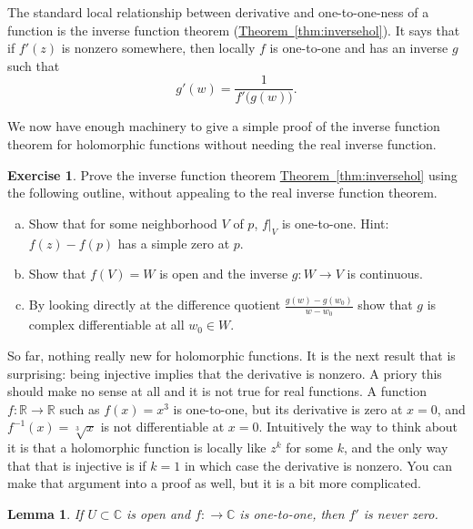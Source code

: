 \documentclass[12pt,openany]{book}
\newcommand{\C}{{\mathbb{C}}}
\newcommand{\R}{{\mathbb{R}}}
\theoremstyle{plain}
\newtheorem{lemma}[thm]{Lemma}
\theoremstyle{remark}
\theoremstyle{definition}
\newenvironment{exbox}{%
    \def\FrameCommand{\vrule width 1pt \relax\hspace {10pt}}%
    \MakeFramed {\advance \hsize -\width \FrameRestore }%
}{%
    \endMakeFramed
}
\newenvironment{exparts}{%
    \leavevmode\begin{enumerate}[a),noitemsep,topsep=0pt,parsep=0pt,partopsep=0pt]
}{%
    \end{enumerate}
}
\theoremstyle{exercise}
\newtheorem{exercise}{Exercise}[section]
\theoremstyle{example}
\newcommand{\thmref}[1]{\hyperref[#1]{Theorem~\ref*{#1}}}
\begin{document}
The standard local relationship between derivative and one-to-one-ness of a
function is the inverse function theorem (\thmref{thm:inversehol}).
It says that if $f'(z)$ is nonzero somewhere, then locally $f$ is
one-to-one and has an inverse $g$ such that
\begin{equation*}
g'(w) = \frac{1}{f'\bigl(g(w)\bigr)} .
\end{equation*}

We now have enough machinery to give a simple proof
of the inverse function theorem for holomorphic functions
without needing the real inverse function.

\begin{exbox}
\begin{exercise}
Prove the inverse function theorem \thmref{thm:inversehol}
using the following outline, without appealing to the real inverse function
theorem.
\begin{exparts}
\item Show that for some neighborhood $V$ of $p$, $f|_V$ is one-to-one.
Hint: $f(z)-f(p)$ has a simple zero at $p$.
\item Show that $f(V) = W$ is open and the inverse $g \colon W \to V$ is
continuous.
\item By looking directly at the difference quotient $\frac{g(w)-g(w_0)}{w-w_0}$
show that $g$ is complex differentiable at all $w_0 \in W$.
\end{exparts}
\end{exercise}
\end{exbox}

So far, nothing really new for holomorphic functions.
It is the next
result that is surprising: being injective
implies that the derivative is nonzero.
A priory this should make no sense at all and it is not true for real functions.
A function $f \colon \R \to \R$ such as $f(x) = x^3$
is one-to-one, but its derivative is zero at $x=0$, and $f^{-1}(x) =
\sqrt[3]{x}$ is not differentiable at $x=0$.
Intuitively the way to think about it is that a holomorphic function is
locally like $z^k$ for some $k$, and the only way that that is injective is
if $k=1$ in which case the derivative is nonzero.  You can make that
argument into a proof as well, but it is a bit more complicated.

\begin{lemma} \label{lemma:dernonzero}
If $U \subset \C$ is open and $f \colon \to \C$ is one-to-one, then
$f'$ is never zero.
\end{lemma}
\end{document}

